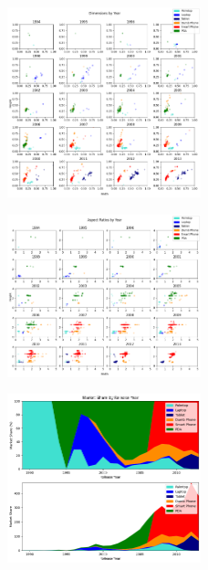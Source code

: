 \documentclass[conference]{IEEEtran}
\begin{document}
\begin{figure}
    \centering
    \includegraphics[width=0.5\textwidth]{../Visualisations/B/DimensionsYear.png}
    \caption{}
    \label{fig:DimensionsYear}
\end{figure}
\begin{figure}
    \centering
    \includegraphics[width=0.5\textwidth]{../Visualisations/B/AspectRatioYear.png}
    \caption{}
    \label{fig:AspectRatioYear}
\end{figure}
\begin{figure}
    \centering
    \includegraphics[width=0.5\textwidth]{../Visualisations/B/MarketShareYear.png}
    \caption{}
    \label{fig:MarketShareYear}
\end{figure}
\end{document}
